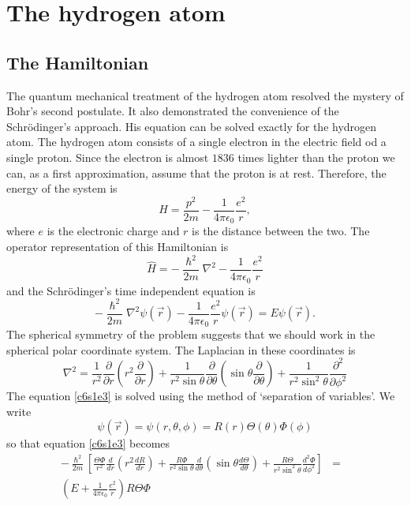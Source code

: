 \chapter{The hydrogen atom}\label{c6}
\section{The Hamiltonian}\label{c6s1}
The quantum mechanical treatment of the hydrogen atom resolved the mystery of 
Bohr's second postulate. It also demonstrated the convenience of the 
Schr\"{o}dinger's approach. His equation can be solved exactly for the hydrogen
atom. The hydrogen atom consists of a single electron in the electric field od a
single proton. Since the electron is almost $1836$ times lighter than the proton
we can, as a first approximation, assume that the proton is at rest. Therefore, 
the energy of the system is
\begin{equation}\label{c6s1e1}
H = \frac{p^2}{2m} - \frac{1}{4\pi\epsilon_0}\frac{e^2}{r},
\end{equation}
where $e$ is the electronic charge and $r$ is the distance between the two. The
operator representation of this Hamiltonian is
\begin{equation}\label{c6s1e2}
\hat{H} = -\frac{\hslash^2}{2m}\nabla^2 - \frac{1}{4\pi\epsilon_0}\frac{e^2}{r}
\end{equation}
and the Schr\"{o}dinger's time independent equation is
\begin{equation}\label{c6s1e3}
-\frac{\hslash^2}{2m}\nabla^2\psi(\vec{r}) - 
\frac{1}{4\pi\epsilon_0}\frac{e^2}{r}\psi(\vec{r}) = E\psi(\vec{r}).
\end{equation}
The spherical symmetry of the problem suggests that we should work in the 
spherical polar coordinate system. The Laplacian in these coordinates is
\begin{equation}\label{c6s1e4}
\nabla^2 = \frac{1}{r^2}\frac{\partial}{\partial r}
\left(r^2\frac{\partial}{\partial r}\right) + 
\frac{1}{r^2\sin\theta}\frac{\partial}{\partial\theta}
\left(\sin\theta\frac{\partial}{\partial\theta}\right) + 
\frac{1}{r^2\sin^2\theta}\frac{\partial^2}{\partial\phi^2}
\end{equation}
The equation \eqref{c6s1e3} is solved using the method of `separation of 
variables'. We write
\begin{equation}\label{c6s1e5}
\psi(\vec{r}) = \psi(r, \theta, \phi) = R(r)\Theta(\theta)\Phi(\phi)
\end{equation}
so that equation \eqref{c6s1e3} becomes
\begin{eqnarray}
-\frac{\hslash^2}{2m}\left[
\frac{\Theta\Phi}{r^2}\frac{d}{dr}\left(r^2\frac{dR}{dr}\right) +
\frac{R\Phi}{r^2\sin\theta}\frac{d}{d\theta}
\left(\sin\theta\frac{d\Theta}{d\theta}\right) + 
\frac{R\Theta}{r^2\sin^2\theta}\frac{d^2\Phi}{d\phi^2}\right] &=& \nonumber \\ 
\left(E + \frac{1}{4\pi\epsilon_0}\frac{e^2}{r}\right)R\Theta\Phi & & 
\label{c6s1e6}
\end{eqnarray}
